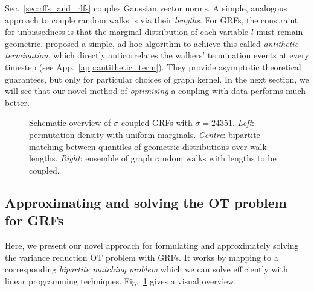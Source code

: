 Sec.~\ref{sec:rffs_and_rlfs} couples Gaussian vector norms. 
A simple, analogous approach to couple random walks is via their \emph{lengths}. 
For GRFs, the constraint for unbiasedness is that the marginal distribution of each variable $l$ must remain geometric. 
\citet{reid2023quasi} proposed a simple, ad-hoc algorithm to achieve this called \emph{antithetic termination}, which directly anticorrelates the walkers' termination events at every timestep (see App.~\ref{app:antithetic_term}). 
They provide asymptotic theoretical guarantees, but only for particular choices of graph kernel. 
In the next section, we will see that our novel method of \emph{optimising} a coupling with data performs much better. 

\begin{figure}
\centering \hspace{-8mm}
    
\caption{Schematic overview of $\sigma$-coupled GRFs with $\sigma=24351$.
\emph{Left}: permutation density with uniform marginals. 
\emph{Centre}: bipartite matching between quantiles of geometric distributions over walk lengths. 
\emph{Right}: ensemble of graph random walks with lengths to be coupled.}\label{fig:main_grfs_schematic} 
\end{figure} \vspace{-2mm}

\subsection{Approximating and solving the OT problem for GRFs} \label{sec:approximating_and_solving_grfs_ot}
Here, we present our novel approach for formulating and approximately solving the variance reduction OT problem with GRFs.
It works by mapping to a corresponding \emph{bipartite matching problem} which we can solve efficiently with linear programming techniques.
Fig.~\ref{fig:main_grfs_schematic} gives a visual overview.



